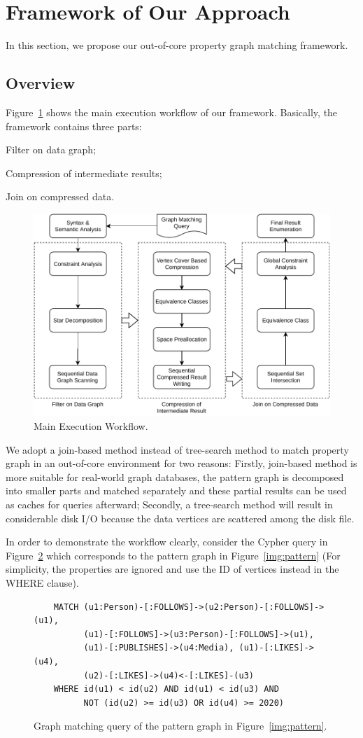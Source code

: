 \section{Framework of Our Approach}\label{sec:framework}
In this section, we propose our out-of-core property graph matching framework.
\subsection{Overview}
Figure~\ref{img:framework} shows the main execution workflow of our framework.
Basically, the framework contains three parts:
\begin{enumerate*}[label={\arabic*.}]
\item Filter on data graph;
\item Compression of intermediate results;
\item Join on compressed data.
\end{enumerate*}
\begin{figure}[ht]
  \centering
  \includegraphics[width=.48\textwidth]{img/framework.pdf}
  \caption{Main Execution Workflow.}\label{img:framework}
\end{figure}
We adopt a join-based method instead of tree-search method to match property graph in an out-of-core environment for two reasons:
Firstly, join-based method is more suitable for real-world graph databases,
the pattern graph is decomposed into smaller parts and matched separately and these partial results can be used as caches for queries afterward;
Secondly, a tree-search method will result in considerable disk I/O because the data vertices are scattered among the disk file.

In order to demonstrate the workflow clearly,
consider the Cypher query in Figure~\ref{img:cypher_query} which corresponds to the pattern graph in Figure~\ref{img:pattern}
(For simplicity, the properties are ignored and use the ID of vertices instead in the WHERE clause).
\begin{figure}[ht]
  \begin{verbatim}
    MATCH (u1:Person)-[:FOLLOWS]->(u2:Person)-[:FOLLOWS]->(u1),
          (u1)-[:FOLLOWS]->(u3:Person)-[:FOLLOWS]->(u1),
          (u1)-[:PUBLISHES]->(u4:Media), (u1)-[:LIKES]->(u4),
          (u2)-[:LIKES]->(u4)<-[:LIKES]-(u3)
    WHERE id(u1) < id(u2) AND id(u1) < id(u3) AND
          NOT (id(u2) >= id(u3) OR id(u4) >= 2020)
  \end{verbatim}
  \caption{Graph matching query of the pattern graph in Figure~\ref{img:pattern}.}\label{img:cypher_query}
\end{figure}

